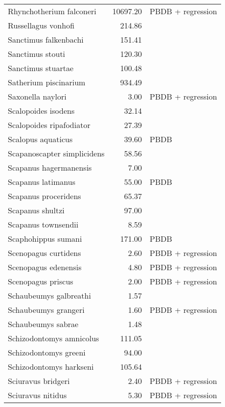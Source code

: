 \begin{table}[ht]
\begin{tabular}{lrl}
  Rhynchotherium falconeri & 10697.20 & PBDB + regression \\ 
  Russellagus vonhofi & 214.86 & \cite{Tomiya2013} \\ 
  Sanctimus falkenbachi & 151.41 & \cite{Tomiya2013} \\ 
  Sanctimus stouti & 120.30 & \cite{Tomiya2013} \\ 
  Sanctimus stuartae & 100.48 & \cite{Tomiya2013} \\ 
  Satherium piscinarium & 934.49 & \cite{Tomiya2013} \\ 
  Saxonella naylori & 3.00 & PBDB + regression \\ 
  Scalopoides isodens & 32.14 & \cite{Tomiya2013} \\ 
  Scalopoides ripafodiator & 27.39 & \cite{Tomiya2013} \\ 
  Scalopus aquaticus & 39.60 & PBDB \\ 
  Scapanoscapter simplicidens & 58.56 & \cite{Tomiya2013} \\ 
  Scapanus hagermanensis & 7.00 & \cite{McKenna2011} \\ 
  Scapanus latimanus & 55.00 & PBDB \\ 
  Scapanus proceridens & 65.37 & \cite{Tomiya2013} \\ 
  Scapanus shultzi & 97.00 & \cite{McKenna2011} \\ 
  Scapanus townsendii & 8.59 & \cite{Smith2004} \\ 
  Scaphohippus sumani & 171.00 & PBDB \\ 
  Scenopagus curtidens & 2.60 & PBDB + regression \\ 
  Scenopagus edenensis & 4.80 & PBDB + regression \\ 
  Scenopagus priscus & 2.00 & PBDB + regression \\ 
  Schaubeumys galbreathi & 1.57 & \cite{Loomis1911} \\ 
  Schaubeumys grangeri & 1.60 & PBDB + regression \\ 
  Schaubeumys sabrae & 1.48 & \cite{Matthew1901} \\ 
  Schizodontomys amnicolus & 111.05 & \cite{Tomiya2013} \\ 
  Schizodontomys greeni & 94.00 & \cite{McKenna2011} \\ 
  Schizodontomys harkseni & 105.64 & \cite{Tomiya2013} \\ 
  Sciuravus bridgeri & 2.40 & PBDB + regression \\ 
  Sciuravus nitidus & 5.30 & PBDB + regression \\ 

\end{tabular}
\end{table}
